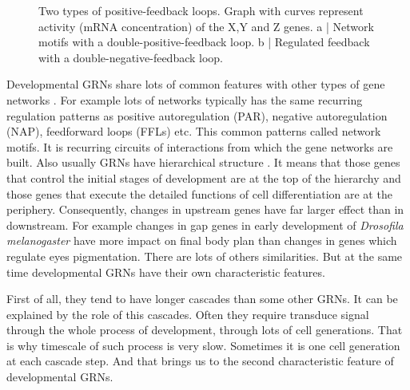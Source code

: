 \documentclass[a4paper, twoside]{report}
\begin{document}
\begin{figure}[h]
\caption{Two types of positive-feedback loops. Graph with curves represent activity (mRNA concentration) of the X,Y and Z genes. 
a | Network motifs with a double-positive-feedback loop.
b | Regulated feedback with a double-negative-feedback loop.}
\label{fig:fig_1}
\end{figure}

Developmental GRNs share lots of common features with other types of gene networks \cite{Alon2007}.
For example lots of networks typically has the same recurring regulation patterns as positive autoregulation (PAR), negative autoregulation (NAP), feedforward loops (FFLs) etc.
This common patterns called network motifs.
It is recurring circuits of interactions from which the gene networks are built.
Also usually GRNs have hierarchical structure \cite{Erwin2009}.
It means that those genes that control the initial stages of development are at the top of the hierarchy and those genes that execute the detailed functions of cell differentiation are at the periphery.
Consequently, changes in upstream genes have far larger effect than in downstream.
For example changes in gap genes in early development of \textit{Drosofila melanogaster} have more impact on final body plan than changes in genes which regulate eyes pigmentation.
There are lots of others similarities.
But at the same time developmental GRNs have their own characteristic features.

First of all, they tend to have longer cascades than some other GRNs.
It can be explained by the role of this cascades.
Often they require transduce signal through the whole process of development, through lots of cell generations.
That is why timescale of such process is very slow.
Sometimes it is one cell generation at each cascade step.
And that brings us to the second characteristic feature of developmental GRNs.
\end{document}
